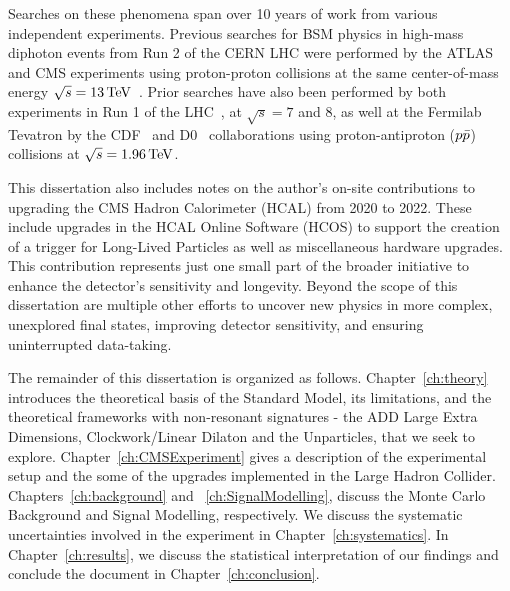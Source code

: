 Searches on these phenomena span over 10 years of work from various independent experiments. Previous searches for BSM physics in high-mass diphoton events from Run 2 of the CERN LHC were performed by the ATLAS and CMS experiments using proton-proton collisions at the same center-of-mass energy $\sqrt{s}=13\,\text{Te\hspace{-.08em}V}$~\cite{Sirunyan:2018wnk,Aad:2021,Aaboud:2017yyg,Khachatryan:2016yec,Aaboud:2016tru,Khachatryan:2016hje}. Prior searches have also been performed by both experiments in Run 1 of the LHC~\cite{Aad:2015mna,Khachatryan:2015qba,Aad:2012cy,Chatrchyan:2011fq,Chatrchyan:2011jx}, at $\sqrt{s}=7$ and 8\TeV, as well at the Fermilab Tevatron by the CDF~\cite{Aaltonen:2011xp,CDF:2002hrr,CDF:2010muc,CDF:2011weq} and D0~\cite{Abazov:2010xh,D0:2000cve,D0:2008hxb,D0:2005srl} collaborations using proton-antiproton ($p\Bar{p}$) collisions at $\sqrt{s}=1.96\,\text{Te\hspace{-.08em}V}$.

 This dissertation also includes notes on the author's on-site contributions to upgrading the CMS Hadron Calorimeter (HCAL) from 2020 to 2022. These include upgrades in the HCAL Online Software (HCOS) to support the creation of a trigger for Long-Lived Particles as well as miscellaneous hardware upgrades. This contribution represents just one small part of the broader initiative to enhance the detector's sensitivity and longevity. Beyond the scope of this dissertation are multiple other efforts to uncover new physics in more complex, unexplored final states, improving detector sensitivity, and ensuring uninterrupted data-taking.

The remainder of this dissertation is organized as follows. Chapter~\ref{ch:theory} introduces the theoretical basis of the Standard Model, its limitations, and the theoretical frameworks with non-resonant signatures - the ADD Large Extra Dimensions, Clockwork/Linear Dilaton and the Unparticles, that we seek to explore. Chapter~\ref{ch:CMSExperiment} gives a description of the experimental setup and the some of the upgrades implemented in the Large Hadron Collider. Chapters~\ref{ch:background} and ~\ref{ch:SignalModelling}, discuss the Monte Carlo Background and Signal Modelling, respectively. We discuss the systematic uncertainties involved in the experiment in Chapter~\ref{ch:systematics}. In Chapter~\ref{ch:results}, we discuss the statistical interpretation of our findings and conclude the document in Chapter~\ref{ch:conclusion}.

